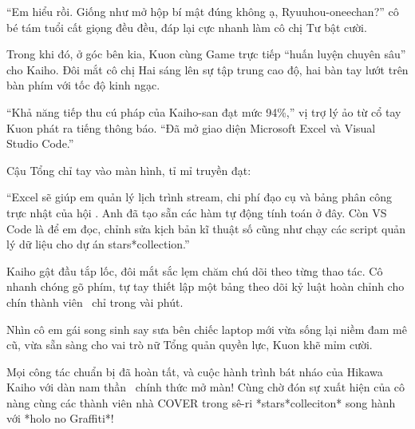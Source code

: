 \documentclass[../main.tex]{subfiles}
\begin{document}
``Em hiểu rồi. Giống như mở hộp bí mật đúng không ạ, Ryuuhou-oneechan?'' cô bé tám tuổi cất giọng đều đều, đáp lại cực nhanh làm cô chị Tư bật cười.

Trong khi đó, ở góc bên kia, Kuon cùng Game trực tiếp ``huấn luyện chuyên sâu'' cho Kaiho. Đôi mắt cô chị Hai sáng lên sự tập trung cao độ, hai bàn tay lướt trên bàn phím với tốc độ kinh ngạc.

``Khả năng tiếp thu cú pháp của Kaiho-san đạt mức 94\%,'' vị trợ lý ảo từ cổ tay Kuon phát ra tiếng thông báo. ``Đã mở giao diện Microsoft Excel và Visual Studio Code.''

Cậu Tổng chỉ tay vào màn hình, tỉ mỉ truyền đạt:

``Excel sẽ giúp em quản lý lịch trình stream, chi phí đạo cụ và bảng phân công trực nhật của hội \hls. Anh đã tạo sẵn các hàm tự động tính toán ở đây. Còn VS Code là để em đọc, chỉnh sửa kịch bản kĩ thuật số cũng như chạy các script quản lý dữ liệu cho dự án stars*collection.''

Kaiho gật đầu tắp lốc, đôi mắt sắc lẹm chăm chú dõi theo từng thao tác. Cô nhanh chóng gõ phím, tự tay thiết lập một bảng theo dõi kỷ luật hoàn chỉnh cho chín thành viên \hls\ chỉ trong vài phút.

Nhìn cô em gái song sinh say sưa bên chiếc laptop mới vừa sống lại niềm đam mê cũ, vừa sẵn sàng cho vai trò nữ Tổng quản quyền lực, Kuon khẽ mỉm cười.

Mọi công tác chuẩn bị đã hoàn tất, và cuộc hành trình bát nháo của Hikawa Kaiho với dàn nam thần \hls\ chính thức mở màn! Cùng chờ đón sự xuất hiện của cô nàng cùng các thành viên nhà COVER trong sê-ri *stars*colleciton* song hành với *holo no Graffiti*!
\end{document}
